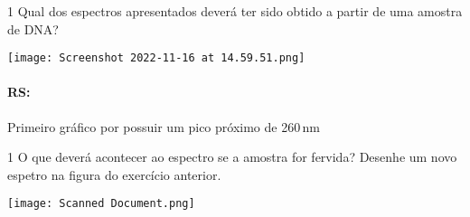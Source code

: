 \documentclass[\mainfilename]{subfiles}
\begin{document}
\begin{questionBox}1{ %
    Qual dos espectros apresentados deverá ter sido obtido a partir de uma amostra de DNA?
} %
    
    \begin{center}
        \texttt{[image: Screenshot 2022-11-16 at 14.59.51.png]}
    \end{center}

    \paragraph*{RS:} Primeiro gráfico por possuir um pico próximo de 260\,\unit{\nano\metre}

\end{questionBox}

\begin{questionBox}1{ %
    O que deverá acontecer ao espectro se a amostra for fervida? Desenhe um novo espetro na figura do exercício anterior.
} %

    \begin{center}
        \texttt{[image: Scanned Document.png]}
    \end{center}
    
\end{questionBox}
\end{document}
